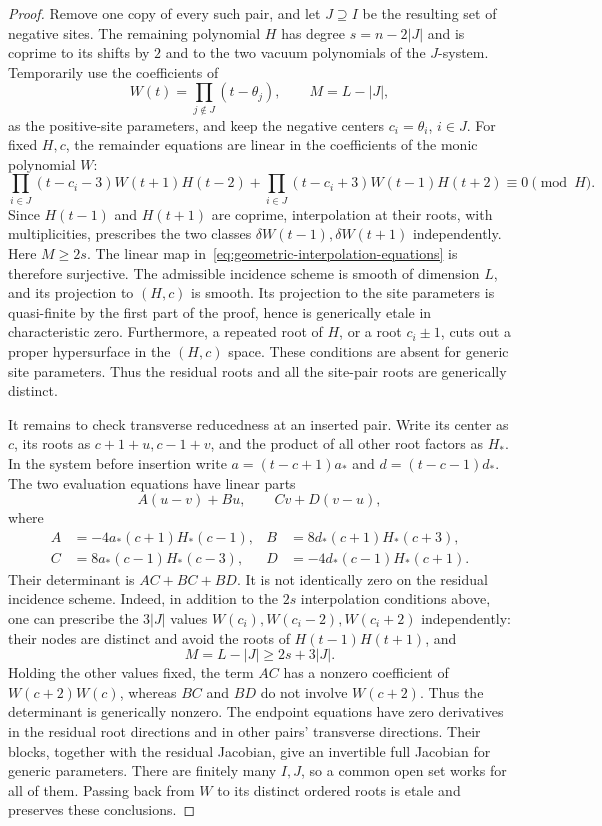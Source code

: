 \documentclass[11pt]{article}
\theoremstyle{definition}
\begin{document}
\begin{proof}
Remove one copy of every such pair, and let $J\supseteq I$ be the
resulting set of negative sites. The remaining polynomial $H$ has
degree $s=n-2|J|$ and is coprime to its shifts by $2$ and to the
two vacuum polynomials of the $J$-system. Temporarily use the
coefficients of
\[
 W(t)=\prod_{j\notin J}(t-\theta_j),\qquad M=L-|J|,
\]
as the positive-site parameters, and keep the negative centers
$c_i=\theta_i$, $i\in J$. For fixed $H,c$, the remainder equations
are linear in the coefficients of the monic polynomial $W$:
\begin{equation}\label{eq:geometric-interpolation-equations}
 \prod_{i\in J}(t-c_i-3)W(t+1)H(t-2)
 +\prod_{i\in J}(t-c_i+3)W(t-1)H(t+2)
 \equiv0\pmod H.
\end{equation}
Since $H(t-1)$ and $H(t+1)$ are coprime, interpolation at their
roots, with multiplicities, prescribes the two classes
$\delta W(t-1),\delta W(t+1)$ independently. Here $M\ge2s$.
The linear map in~\eqref{eq:geometric-interpolation-equations}
is therefore surjective. The admissible incidence scheme is smooth
of dimension $L$, and its projection to $(H,c)$ is smooth. Its
projection to the site parameters is quasi-finite by the first part
of the proof, hence is generically etale in characteristic zero.
Furthermore, a repeated root of $H$, or a root $c_i\pm1$, cuts
out a proper hypersurface in the $(H,c)$ space. These conditions
are absent for generic site parameters. Thus the residual roots and
all the site-pair roots are generically distinct.

It remains to check transverse reducedness at an inserted pair.
Write its center as $c$, its roots as $c+1+u,c-1+v$, and the
product of all other root factors as $H_*$. In the system before
insertion write $a=(t-c+1)a_*$ and $d=(t-c-1)d_*$. The two
evaluation equations have linear parts
\[
 A(u-v)+Bu,\qquad Cv+D(v-u),
\]
where
\[
 \begin{aligned}
 A&=-4a_*(c+1)H_*(c-1),&
 B&=8d_*(c+1)H_*(c+3),\\
 C&=8a_*(c-1)H_*(c-3),&
 D&=-4d_*(c-1)H_*(c+1).
 \end{aligned}
\]
Their determinant is $AC+BC+BD$. It is not identically zero on
the residual incidence scheme. Indeed, in addition to the $2s$
interpolation conditions above, one can prescribe the $3|J|$
values $W(c_i),W(c_i-2),W(c_i+2)$ independently: their nodes are
distinct and avoid the roots of $H(t-1)H(t+1)$, and
\[
 M=L-|J|\ge2s+3|J|.
\]
Holding the other values fixed, the term $AC$ has a nonzero
coefficient of $W(c+2)W(c)$, whereas $BC$ and $BD$ do not
involve $W(c+2)$. Thus the determinant is generically nonzero.
The endpoint equations have zero derivatives in the residual root
directions and in other pairs' transverse directions. Their blocks,
together with the residual Jacobian, give an invertible full
Jacobian for generic parameters. There are finitely many $I,J$,
so a common open set works for all of them. Passing back from $W$
to its distinct ordered roots is etale and preserves these conclusions.
\end{proof}
\end{document}
